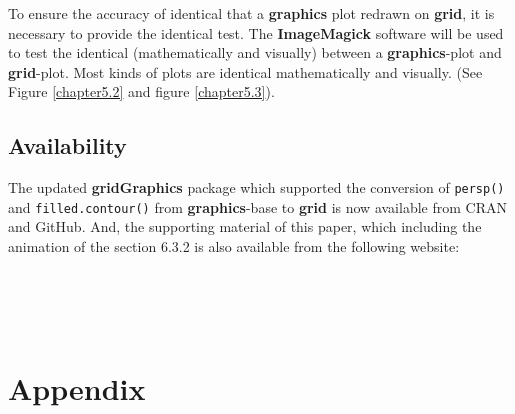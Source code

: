 \documentclass{report}
\begin{document}
To ensure the accuracy of identical that a \textbf{graphics} plot redrawn on \textbf{grid}, it is necessary to provide the identical test. The \textbf{ImageMagick} software will be used to test the identical (mathematically and visually) between a \textbf{graphics}-plot and \textbf{grid}-plot. Most kinds of plots are identical mathematically and visually. (See Figure \ref{chapter5.2} and figure \ref{chapter5.3}).

\section*{Availability}
The updated \textbf{gridGraphics} package which supported the conversion of \texttt{persp()} and \texttt{filled.contour()} from \textbf{graphics}-base to \textbf{grid} is now available from CRAN and GitHub. And, the supporting material of this paper, which including the animation of the section 6.3.2 is also available from the following website: \\
\begin{center}
     \\
     \\
    \\
\end{center}




 


\chapter{Appendix}
\end{document}
